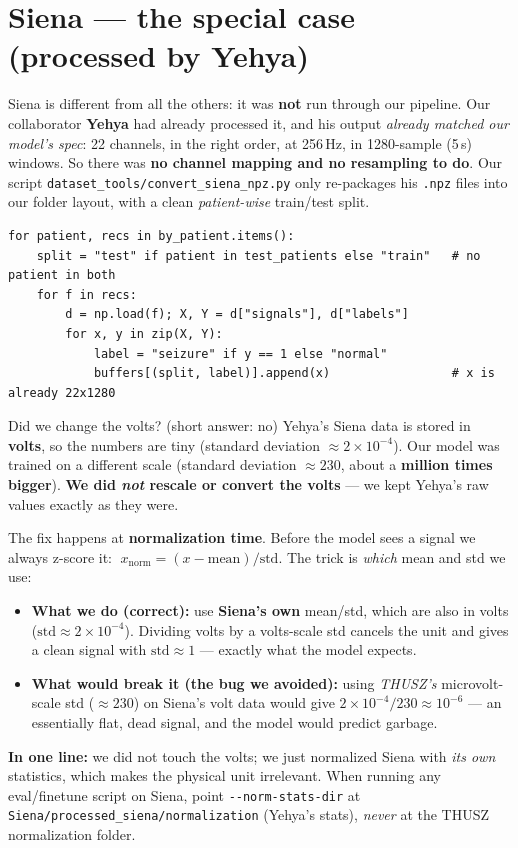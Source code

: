 \documentclass[11pt]{article}
\begin{document}
\section{Siena --- the special case (processed by Yehya)}
Siena is different from all the others: it was \textbf{not} run through our
pipeline. Our collaborator \textbf{Yehya} had already processed it, and his
output \emph{already matched our model's spec}: 22 channels, in the right order,
at 256\,Hz, in 1280-sample (5\,s) windows. So there was \textbf{no channel
mapping and no resampling to do}. Our script
\texttt{dataset\_tools/convert\_siena\_npz.py} only re-packages his \texttt{.npz}
files into our folder layout, with a clean \emph{patient-wise} train/test split.
\begin{lstlisting}
for patient, recs in by_patient.items():
    split = "test" if patient in test_patients else "train"   # no patient in both
    for f in recs:
        d = np.load(f); X, Y = d["signals"], d["labels"]
        for x, y in zip(X, Y):
            label = "seizure" if y == 1 else "normal"
            buffers[(split, label)].append(x)                 # x is already 22x1280
\end{lstlisting}

\begin{keybox}{Did we change the volts? (short answer: no)}
Yehya's Siena data is stored in \textbf{volts}, so the numbers are tiny
(standard deviation $\approx 2\times10^{-4}$). Our model was trained on a
different scale (standard deviation $\approx 230$, about a \textbf{million times
bigger}). \textbf{We did \emph{not} rescale or convert the volts} --- we kept
Yehya's raw values exactly as they were.

The fix happens at \textbf{normalization time}. Before the model sees a signal
we always z-score it: $\;x_{\text{norm}} = (x - \text{mean}) / \text{std}$. The
trick is \emph{which} mean and std we use:
\begin{itemize}[nosep,leftmargin=1.4em]
  \item \textbf{What we do (correct):} use \textbf{Siena's own} mean/std, which
  are also in volts ($\text{std}\approx 2\times10^{-4}$). Dividing volts by a
  volts-scale std cancels the unit and gives a clean signal with
  $\text{std}\approx 1$ --- exactly what the model expects.
  \item \textbf{What would break it (the bug we avoided):} using \emph{THUSZ's}
  microvolt-scale std ($\approx 230$) on Siena's volt data would give
  $2\times10^{-4}/230 \approx 10^{-6}$ --- an essentially flat, dead signal, and
  the model would predict garbage.
\end{itemize}
\textbf{In one line:} we did not touch the volts; we just normalized Siena with
\emph{its own} statistics, which makes the physical unit irrelevant. When running
any eval/finetune script on Siena, point \texttt{-{}-norm-stats-dir} at
\texttt{Siena/processed\_siena/normalization} (Yehya's stats), \emph{never} at
the THUSZ normalization folder.
\end{keybox}
\end{document}
